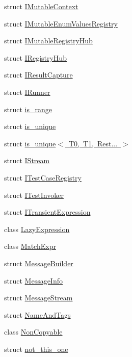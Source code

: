 \begin{DoxyCompactItemize}
struct \mbox{\hyperlink{struct_catch_1_1_i_mutable_context}{I\+Mutable\+Context}}
\item 
struct \mbox{\hyperlink{struct_catch_1_1_i_mutable_enum_values_registry}{I\+Mutable\+Enum\+Values\+Registry}}
\item 
struct \mbox{\hyperlink{struct_catch_1_1_i_mutable_registry_hub}{I\+Mutable\+Registry\+Hub}}
\item 
struct \mbox{\hyperlink{struct_catch_1_1_i_registry_hub}{I\+Registry\+Hub}}
\item 
struct \mbox{\hyperlink{struct_catch_1_1_i_result_capture}{I\+Result\+Capture}}
\item 
struct \mbox{\hyperlink{struct_catch_1_1_i_runner}{I\+Runner}}
\item 
struct \mbox{\hyperlink{struct_catch_1_1is__range}{is\+\_\+range}}
\item 
struct \mbox{\hyperlink{struct_catch_1_1is__unique}{is\+\_\+unique}}
\item 
struct \mbox{\hyperlink{struct_catch_1_1is__unique_3_01_t0_00_01_t1_00_01_rest_8_8_8_01_4}{is\+\_\+unique$<$ T0, T1, Rest... $>$}}
\item 
struct \mbox{\hyperlink{struct_catch_1_1_i_stream}{I\+Stream}}
\item 
struct \mbox{\hyperlink{struct_catch_1_1_i_test_case_registry}{I\+Test\+Case\+Registry}}
\item 
struct \mbox{\hyperlink{struct_catch_1_1_i_test_invoker}{I\+Test\+Invoker}}
\item 
struct \mbox{\hyperlink{struct_catch_1_1_i_transient_expression}{I\+Transient\+Expression}}
\item 
class \mbox{\hyperlink{class_catch_1_1_lazy_expression}{Lazy\+Expression}}
\item 
class \mbox{\hyperlink{class_catch_1_1_match_expr}{Match\+Expr}}
\item 
struct \mbox{\hyperlink{struct_catch_1_1_message_builder}{Message\+Builder}}
\item 
struct \mbox{\hyperlink{struct_catch_1_1_message_info}{Message\+Info}}
\item 
struct \mbox{\hyperlink{struct_catch_1_1_message_stream}{Message\+Stream}}
\item 
struct \mbox{\hyperlink{struct_catch_1_1_name_and_tags}{Name\+And\+Tags}}
\item 
class \mbox{\hyperlink{class_catch_1_1_non_copyable}{Non\+Copyable}}
\item 
struct \mbox{\hyperlink{struct_catch_1_1not__this__one}{not\+\_\+this\+\_\+one}}

\end{DoxyCompactItemize}
